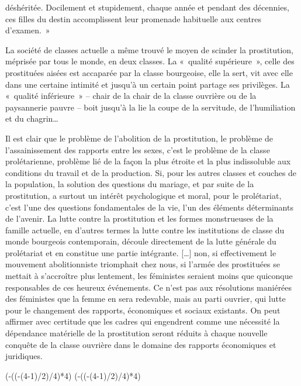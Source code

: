 \documentclass[french,twoside]{book} %
\def\truncdiv#1#2{((#1-(#2-1)/2)/#2)}
\def\moduloop#1#2{(#1-\truncdiv{#1}{#2}*#2)}
\def\modulo#1#2{\number\numexpr\moduloop{#1}{#2}\relax}
\begin{document}
déshéritée. Docilement et stupidement, chaque année et pendant des décennies, ces filles du destin accomplissent leur promenade habituelle aux centres d’examen. »\par
La société de classes actuelle a même trouvé le moyen de scinder la prostitution, méprisée par tous le monde, en deux classes. La « qualité supérieure », celle des prostituées aisées est accaparée par la classe bourgeoise, elle la sert, vit avec elle dans une certaine intimité et jusqu’à un certain point partage ses privilèges. La « qualité inférieure » – chair de la chair de la classe ouvrière ou de la paysannerie pauvre – boit jusqu’à la lie la coupe de la servitude, de l’humiliation et du chagrin…\par
Il est clair que le problème de l’abolition de la prostitution, le problème de l’assainissement des rapports entre les sexes, c’est le problème de la classe prolétarienne, problème lié de la façon la plus étroite et la plus indissoluble aux conditions du travail et de la production. Si, pour les autres classes et couches de la population, la solution des questions du mariage, et par suite de la prostitution, a surtout un intérêt psychologique et moral, pour le prolétariat, c’est l’une des questions fondamentales de la vie, l’un des éléments déterminants de l’avenir. La lutte contre la prostitution et les formes monstrueuses de la famille actuelle, en d’autres termes la lutte contre les institutions de classe du monde bourgeois contemporain, découle directement de la lutte générale du prolétariat et en constitue une partie intégrante. […] non, si effectivement le mouvement abolitionniste triomphait chez nous, si l’armée des prostituées se mettait à s’accroître plus lentement, les féministes seraient moins que quiconque responsables de ces heureux événements. Ce n’est pas aux résolutions maniérées des féministes que la femme en sera redevable, mais au parti ouvrier, qui lutte pour le changement des rapports, économiques et sociaux existants. On peut affirmer avec certitude que les cadres qui engendrent comme une nécessité la dépendance matérielle de la prostitution seront réduits à chaque nouvelle conquête de la classe ouvrière dans le domaine des rapports économiques et juridiques.\par
\bigbreak
\bigbreak
\bigbreak
 


\ifbooklet
  \pagestyle{empty}
  \clearpage
  \ifnum\modulo{\value{page}}{4}=0 \hbox{}\newpage\hbox{}\newpage\fi
  \ifnum\modulo{\value{page}}{4}=1 \hbox{}\newpage\hbox{}\newpage\fi
\end{document}
